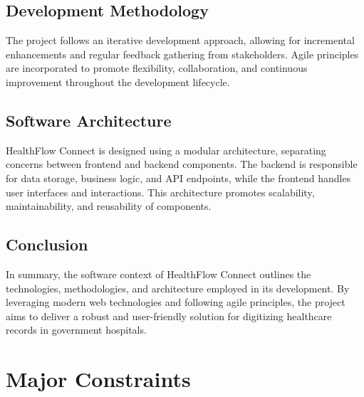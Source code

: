 \subsection{Development Methodology}

The project follows an iterative development approach, allowing for incremental enhancements and regular feedback gathering from stakeholders. Agile principles are incorporated to promote flexibility, collaboration, and continuous improvement throughout the development lifecycle.

\subsection{Software Architecture}

HealthFlow Connect is designed using a modular architecture, separating concerns between frontend and backend components. The backend is responsible for data storage, business logic, and API endpoints, while the frontend handles user interfaces and interactions. This architecture promotes scalability, maintainability, and reusability of components.

\subsection{Conclusion}

In summary, the software context of HealthFlow Connect outlines the technologies, methodologies, and architecture employed in its development. By leveraging modern web technologies and following agile principles, the project aims to deliver a robust and user-friendly solution for digitizing healthcare records in government hospitals.

\section{Major Constraints}

